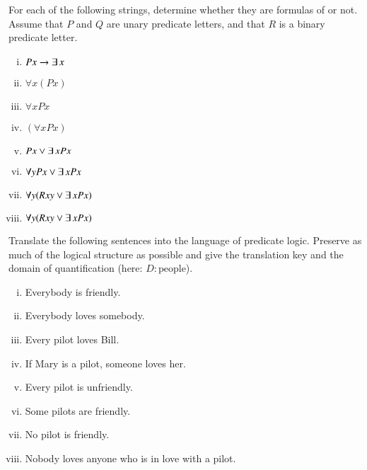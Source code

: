 \documentclass[nobib,nofonts]{tufte-handout}
\newcommand{\predlog}{\acro{PredLog}}
\begin{document}
\bigskip
\noindent \colorbox{mygray}{\centering
  \begin{minipage}{1.0\textwidth}

    \begin{exercise}
      For each of the following strings, determine whether they are formulas of \predlog or not. Assume that $P$ and $Q$ are unary predicate letters, and that $R$ is a binary predicate letter.
      \begin{multicols}{2}
      \begin{enumerate}[(i)]
        \item $Px \rightarrow \exists \thinspace x$
        \item $\forall x (Px)$
        \item $\forall x Px$
        \item $(\forall x Px)$
        \item $Px \vee \exists \thinspace x Px$
        \item $\forall y Px \vee \exists \thinspace x Px$
        \item $\forall y (Rxy \vee \exists \thinspace x Px)$
        \item $\forall y (Rxy \vee \exists \thinspace x Px)$
      \end{enumerate}
    \end{multicols}
    \end{exercise}

    \begin{exercise}
      Translate the following sentences into the language of predicate logic. Preserve as much of   the logical structure as possible and give the translation key and the domain of   quantification (here: $D: \text{people}$).
      \begin{enumerate}[(i)]
        \item Everybody is friendly.
        \item Everybody loves somebody.
        \item Every pilot loves Bill.
        \item If Mary is a pilot, someone loves her.
        \item Every pilot is unfriendly.
        \item Some pilots are friendly.
        \item No pilot is friendly.
        \item Nobody loves anyone who is in love with a pilot.
      \end{enumerate}
    \end{exercise}


\end{minipage}}
\end{document}
